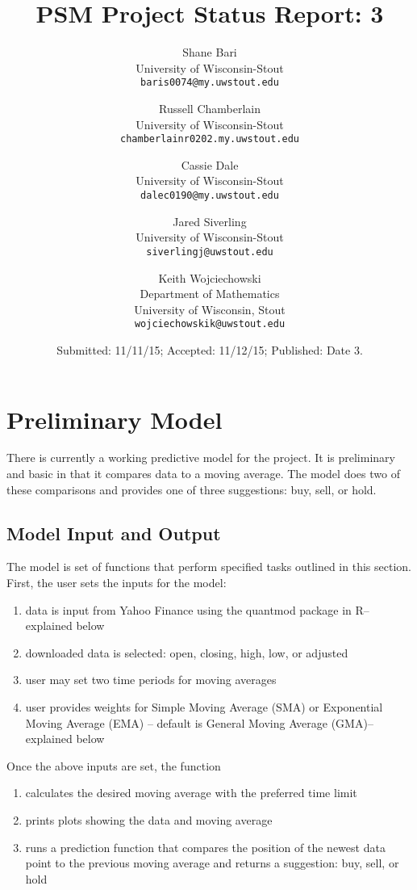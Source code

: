 \documentclass[11pt]{article}
\title{PSM Project Status Report: 3}
\author{
Shane Bari\\
\small University of Wisconsin-Stout\\[-0.8ex]
\small \texttt{baris0074@my.uwstout.edu}
\and
Russell Chamberlain\\
\small University of Wisconsin-Stout\\[-0.8ex]
\small \texttt{chamberlainr0202.my.uwstout.edu}
\and
Cassie Dale\\
\small University of Wisconsin-Stout\\[-0.8ex]
\small \texttt{dalec0190@my.uwstout.edu}
\and
Jared Siverling\\
\small University of Wisconsin-Stout\\[-0.8ex]
\small \texttt{siverlingj@uwstout.edu}
\and
Keith Wojciechowski\\
\small Department of Mathematics\\[-0.8ex]
\small University of Wisconsin, Stout\\[-0.8ex]
\small \texttt{wojciechowskik@uwstout.edu}
}
\date{\small Submitted: 11/11/15;  Accepted: 11/12/15;  Published: Date 3.}
\begin{document}
\maketitle



\section*{\hspace{-.5cm} Preliminary Model}\label{PM}
There is currently a working predictive model for the project. It is preliminary and basic in that it compares data to a moving average. The model does two of these comparisons and provides one of three suggestions: buy, sell, or hold.

\subsection*{Model Input and Output}\label{PMWID}

The model is set of functions that perform specified tasks outlined in this section. First, the user sets the inputs for the model:
\begin{enumerate}
	\item data is input from Yahoo Finance using the quantmod package in R--explained below
	\item downloaded data is selected: open, closing, high, low, or adjusted
	\item user may set two time periods for moving averages
	\item user provides weights for Simple Moving Average (SMA) or Exponential Moving Average (EMA) -- default is General Moving Average (GMA)--explained below
\end{enumerate}

\noindent Once the above inputs are set, the function
\begin{enumerate}
	\item calculates the desired moving average with the preferred time limit
	\item prints plots showing the data and moving average
	\item runs a prediction function that compares the position of the newest data point to the previous moving average and returns a suggestion: buy, sell, or hold
\end{enumerate}
\end{document}
